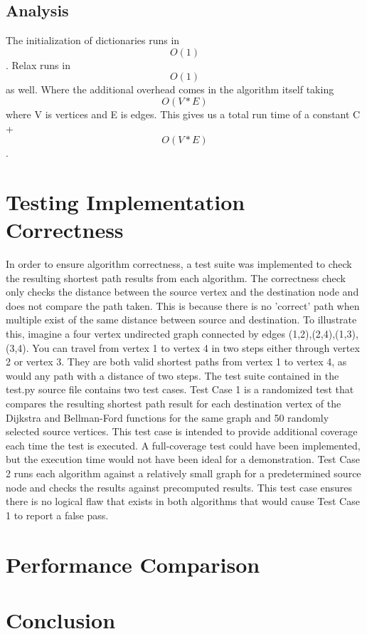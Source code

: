 \subsection{Analysis}
  The initialization of dictionaries runs in \[O(1)\]. Relax runs in \[O(1)\] as well. Where the additional overhead comes in the algorithm itself taking \[O(V*E)\] where V is vertices and E is edges. This gives us a total run time of a constant C + \[O(V*E)\].

\section{Testing Implementation Correctness}
	In order to ensure algorithm correctness, a test suite was implemented to check the resulting shortest path results from each algorithm. The correctness check only checks the distance between the source vertex and the destination node and does not compare the path taken. This is because there is no 'correct' path when multiple exist of the same distance between source and destination. To illustrate this, imagine a four vertex undirected graph connected by edges (1,2),(2,4),(1,3),(3,4). You can travel from vertex 1 to vertex 4 in two steps either through vertex 2 or vertex 3. They are both valid shortest paths from vertex 1 to vertex 4, as would any path with a distance of two steps.
	The test suite contained in the test.py source file contains two test cases. Test Case 1 is a randomized test that compares the resulting shortest path result for each destination vertex of the Dijkstra and Bellman-Ford functions for the same graph and 50 randomly selected source vertices. This test case is intended to provide additional coverage each time the test is executed. A full-coverage test could have been implemented, but the execution time would not have been ideal for a demonstration. Test Case 2 runs each algorithm against a relatively small graph for a predetermined source node and checks the results against precomputed results. This test case ensures there is no logical flaw that exists in both algorithms that would cause Test Case 1 to report a false pass.

\section{Performance Comparison}

\section{Conclusion}





